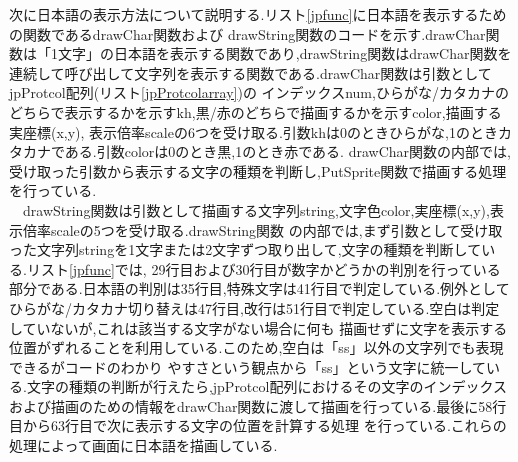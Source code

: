 \documentclass[a4j]{jarticle}
\begin{document}
    次に日本語の表示方法について説明する.リスト\ref{jpfunc}に日本語を表示するための関数であるdrawChar関数および
    drawString関数のコードを示す.drawChar関数は「1文字」の日本語を表示する関数であり,drawString関数はdrawChar関数を
    連続して呼び出して文字列を表示する関数である.drawChar関数は引数としてjpProtcol配列(リスト\ref{jpProtcolarray})の
    インデックスnum,ひらがな/カタカナのどちらで表示するかを示すkh,黒/赤のどちらで描画するかを示すcolor,描画する実座標(x,y),
    表示倍率scaleの6つを受け取る.引数khは0のときひらがな,1のときカタカナである.引数colorは0のとき黒,1のとき赤である.
    drawChar関数の内部では,受け取った引数から表示する文字の種類を判断し,PutSprite関数で描画する処理を行っている.\\
    　drawString関数は引数として描画する文字列string,文字色color,実座標(x,y),表示倍率scaleの5つを受け取る.drawString関数
    の内部では,まず引数として受け取った文字列stringを1文字または2文字ずつ取り出して,文字の種類を判断している.リスト\ref{jpfunc}では,
    29行目および30行目が数字かどうかの判別を行っている部分である.日本語の判別は35行目,特殊文字は41行目で判定している.例外として
    ひらがな/カタカナ切り替えは47行目,改行は51行目で判定している.空白は判定していないが,これは該当する文字がない場合に何も
    描画せずに文字を表示する位置がずれることを利用している.このため,空白は「ss」以外の文字列でも表現できるがコードのわかり
    やすさという観点から「ss」という文字に統一している.文字の種類の判断が行えたら,jpProtcol配列におけるその文字のインデックス
    および描画のための情報をdrawChar関数に渡して描画を行っている.最後に58行目から63行目で次に表示する文字の位置を計算する処理
    を行っている.これらの処理によって画面に日本語を描画している.
\end{document}
